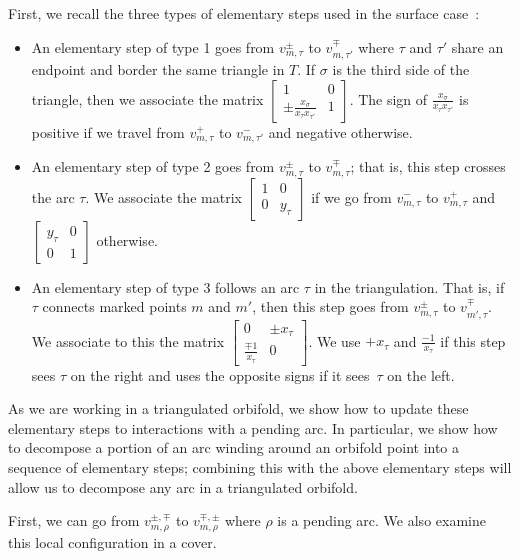\documentclass[11pt]{article}
\numberwithin{equation}{section}
\begin{document}
First, we recall the three types of elementary steps used in the surface case~\cite{MW}:
\begin{itemize}\itemsep=0pt
 \item An elementary step of type 1 goes from $v^\pm_{m,\tau}$ to $v^\mp_{m,\tau'}$ where $\tau$ and $\tau'$ share an endpoint and border the same triangle in $T$. If $\sigma$ is the third side of the triangle, then we associate the matrix $\left[\begin{smallmatrix} 1 & 0 \\ \pm \frac{x_{\sigma}}{x_\tau x_{\tau'}} & 1 \end{smallmatrix}\right]$. The sign of $\frac{x_{\sigma}}{x_\tau x_{\tau'}}$ is positive if we travel from $v^+_{m,\tau}$ to $v^-_{m,\tau'}$ and negative otherwise.
 \item An elementary step of type 2 goes from $v^\pm_{m,\tau}$ to $v^\mp_{m,\tau}$; that is, this step crosses the arc $\tau$. We associate the matrix $\left[\begin{smallmatrix} 1 & 0 \\ 0 & y_\tau \end{smallmatrix}\right]$ if we go from $v^-_{m,\tau}$ to $v^+_{m,\tau}$ and $\left[\begin{smallmatrix} y_\tau & 0 \\ 0 & 1 \end{smallmatrix}\right]$ otherwise.
 \item An elementary step of type 3 follows an arc $\tau$ in the triangulation. That is, if $\tau$ connects marked points $m$ and $m'$, then this step goes from $v^\pm_{m, \tau}$ to $v^\mp_{m',\tau}$. We associate to this the matrix $\left[\begin{smallmatrix} 0 & \pm x_\tau \\ \frac{\mp 1}{x_\tau} & 0 \end{smallmatrix}\right]$. We use $+ x_\tau$ and $\frac{-1}{x_\tau}$ if this step sees $\tau$ on the right and uses the opposite signs if it sees~$\tau$ on the left.
\end{itemize}

As we are working in a triangulated orbifold, we show how to update these elementary steps to interactions with a pending arc. In particular, we show how to decompose a portion of an arc winding around an orbifold point into a sequence of elementary steps; combining this with the above elementary steps will allow us to decompose any arc in a triangulated orbifold.

First, we can go from $v^{\pm,\mp}_{m,\rho}$ to $v^{\mp,\pm}_{m,\rho}$ where $\rho$ is a pending arc. We also examine this local configuration in a cover.
\end{document}

